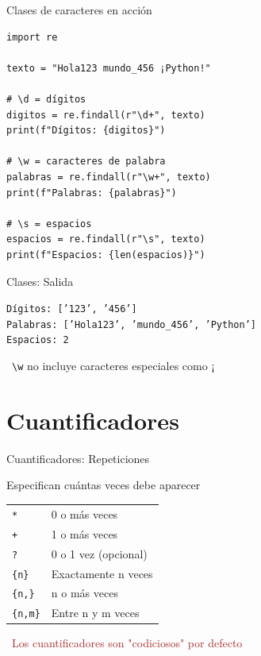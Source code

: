 \documentclass{beamer}
\begin{document}
\begin{frame}[fragile]{Clases de caracteres en acción \faCode}
\begin{lstlisting}
import re

texto = "Hola123 mundo_456 ¡Python!"

# \d = dígitos
digitos = re.findall(r"\d+", texto)
print(f"Dígitos: {digitos}")

# \w = caracteres de palabra
palabras = re.findall(r"\w+", texto)
print(f"Palabras: {palabras}")

# \s = espacios
espacios = re.findall(r"\s", texto)
print(f"Espacios: {len(espacios)}")
\end{lstlisting}
\end{frame}

\begin{frame}[fragile]{Clases: Salida \faArrowCircleRight}
\begin{tcolorbox}[colback=green!10,colframe=green,title={\small\faArrowCircleRight \ Salida},coltitle=fg0,left=3pt,right=3pt,top=3pt,bottom=3pt,boxsep=2pt]
\small\texttt{Dígitos: ['123', '456']\\
Palabras: ['Hola123', 'mundo\_456', 'Python']\\
Espacios: 2}
\end{tcolorbox}

\vspace{0.3cm}
\begin{notebox}
\small\faInfoCircle\ \texttt{\textbackslash w} no incluye caracteres especiales como ¡
\end{notebox}
\end{frame}

\section{Cuantificadores}

\begin{frame}{Cuantificadores: Repeticiones \faRedoAlt}
\begin{conceptbox}{Especifican cuántas veces debe aparecer}
\small
\begin{tabular}{ll}
\texttt{*} & 0 o más veces \\
\texttt{+} & 1 o más veces \\
\texttt{?} & 0 o 1 vez (opcional) \\
\texttt{\{n\}} & Exactamente n veces \\
\texttt{\{n,\}} & n o más veces \\
\texttt{\{n,m\}} & Entre n y m veces \\
\end{tabular}
\end{conceptbox}

\vspace{0.2cm}
\begin{center}
\textcolor{brown}{\faExclamationTriangle\ Los cuantificadores son "codiciosos" por defecto}
\end{center}
\end{frame}
\end{document}
